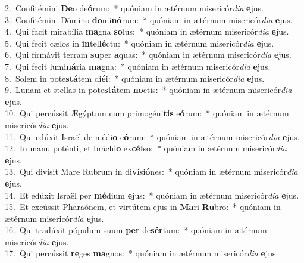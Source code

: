 {2.~}Confitémini \textbf{De}o de\textbf{ó}rum:~* quóniam in ætérnum misericór\textit{di}\textit{a} \textbf{e}jus.\\
{3.~}Confitémini Dómino \textbf{do}mi\textbf{nó}rum:~* quóniam in ætérnum misericór\textit{di}\textit{a} \textbf{e}jus.\\
{4.~}Qui facit mirabília \textbf{ma}gna \textbf{so}lus:~* quóniam in ætérnum misericór\textit{di}\textit{a} \textbf{e}jus.\\
{5.~}Qui fecit cælos in \textbf{in}tel\textbf{lé}ctu:~* quóniam in ætérnum misericór\textit{di}\textit{a} \textbf{e}jus.\\
{6.~}Qui firmávit terram \textbf{su}per \textbf{a}quas:~* quóniam in ætérnum misericór\textit{di}\textit{a} \textbf{e}jus.\\
{7.~}Qui fecit lumi\textbf{ná}ria \textbf{ma}gna:~* quóniam in ætérnum misericór\textit{di}\textit{a} \textbf{e}jus.\\
{8.~}Solem in pote\textbf{stá}tem di\textbf{é}i:~* quóniam in ætérnum misericór\textit{di}\textit{a} \textbf{e}jus.\\
{9.~}Lunam et stellas in pote\textbf{stá}tem \textbf{no}ctis:~* quóniam in ætérnum misericór\textit{di}\textit{a} \textbf{e}jus.\\
{10.~}Qui percússit Ægýptum cum primogéni\textbf{tis} e\textbf{ó}rum:~* quóniam in ætérnum misericór\textit{di}\textit{a} \textbf{e}jus.\\
{11.~}Qui edúxit Israël de médi\textbf{o} e\textbf{ó}rum:~* quóniam in ætérnum misericór\textit{di}\textit{a} \textbf{e}jus.\\
{12.~}In manu poténti, et bráchi\textbf{o} ex\textbf{cél}so:~* quóniam in ætérnum misericór\textit{di}\textit{a} \textbf{e}jus.\\
{13.~}Qui divísit Mare Rubrum in di\textbf{vi}si\textbf{ó}nes:~* quóniam in ætérnum misericór\textit{di}\textit{a} \textbf{e}jus.\\
{14.~}Et edúxit Israël per \textbf{mé}dium \textbf{e}jus:~* quóniam in ætérnum misericór\textit{di}\textit{a} \textbf{e}jus.\\
{15.~}Et excússit Pharaónem, et virtútem ejus in \textbf{Ma}ri \textbf{Ru}bro:~* quóniam in ætérnum misericór\textit{di}\textit{a} \textbf{e}jus.\\
{16.~}Qui tradúxit pópulum suum \textbf{per} de\textbf{sér}tum:~* quóniam in ætérnum misericór\textit{di}\textit{a} \textbf{e}jus.\\
{17.~}Qui percússit \textbf{re}ges \textbf{ma}gnos:~* quóniam in ætérnum misericór\textit{di}\textit{a} \textbf{e}jus.\\
